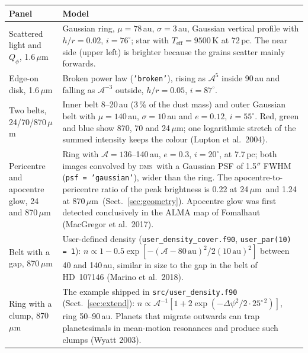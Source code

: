 \documentclass[11pt,a4paper]{article}
\newcommand{\dms}{\textsc{dms}}
\newcommand{\code}[1]{\texttt{#1}}
\newcommand{\um}{\,$\mu$m}
\begin{document}
\begin{center}
\small
\begin{tabularx}{\textwidth}{@{}R{3.6cm}X@{}}
\toprule
Panel & Model \\
\midrule
Scattered light and $Q_\phi$, 1.6\um &
  Gaussian ring, $\mu=78$\,au, $\sigma=3$\,au, Gaussian vertical profile with $h/r=0.02$,
  $i=76^\circ$; star with $T_\mathrm{eff}=9500$\,K at 72\,pc. The near side (upper left) is
  brighter because the grains scatter mainly forwards. \\
Edge-on disk, 1.6\um &
  Broken power law (\code{'broken'}), rising as $\mathcal{A}^{5}$ inside 90\,au and falling as
  $\mathcal{A}^{-3}$ outside, $h/r=0.05$, $i=87^\circ$. \\
Two belts, 24/70/870\um &
  Inner belt 8--20\,au (3\,\% of the dust mass) and outer Gaussian belt with $\mu=140$\,au,
  $\sigma=10$\,au and $e=0.12$, $i=55^\circ$. Red, green and blue show 870, 70 and 24\um; one
  logarithmic stretch of the summed intensity keeps the colour (Lupton et al.\ 2004). \\
Pericentre and apocentre glow, 24 and 870\um &
  Ring with $\mathcal{A}=136$--140\,au, $e=0.3$, $i=20^\circ$, at 7.7\,pc; both images
  convolved by \dms\ with a Gaussian PSF of 1.5$''$ FWHM (\code{psf = 'gaussian'}), wider than
  the ring. The apocentre-to-pericentre ratio of the peak brightness is 0.22 at 24\um\ and 1.24 at
  870\um\ (Sect.~\ref{sec:geometry}). Apocentre glow was first detected conclusively in the
  ALMA map of Fomalhaut (MacGregor et al.\ 2017). \\
Belt with a gap, 870\um &
  User-defined density (\code{user\_density\_cover.f90}, \code{user\_par(10) = 1}):
  $n\propto 1-0.5\exp[-(\mathcal{A}-80\,\mathrm{au})^2/2(10\,\mathrm{au})^2]$ between 40 and
  140\,au, similar in size to the gap in the belt of HD~107146 (Marino et al.\ 2018). \\
Ring with a clump, 870\um &
  The example shipped in \code{src/user\_density.f90} (Sect.~\ref{sec:extend}):
  $n\propto\mathcal{A}^{-1}[1+2\exp(-\Delta\psi^2/2\cdot25^{\circ\,2})]$, ring 50--90\,au. Planets
  that migrate outwards can trap planetesimals in mean-motion resonances and produce such clumps
  (Wyatt 2003). \\
\bottomrule
\end{tabularx}
\end{center}

\end{document}
